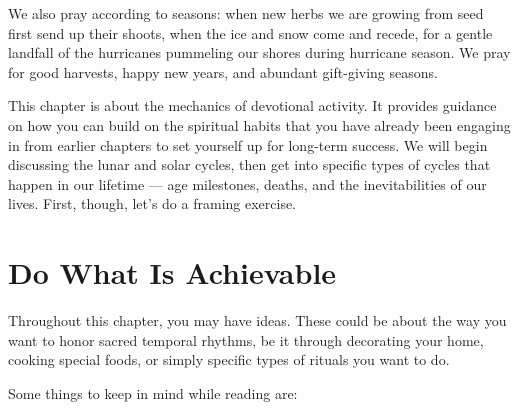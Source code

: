 \documentclass[
]{book}
\begin{document}
We also pray according to seasons: when new herbs we are growing from seed first send up their shoots, when the ice and snow come and recede, for a gentle landfall of the hurricanes pummeling our shores during hurricane season. We pray for good harvests, happy new years, and abundant gift-giving seasons.

This chapter is about the mechanics of devotional activity. It provides guidance on how you can build on the spiritual habits that you have already been engaging in from earlier chapters to set yourself up for long-term success. We will begin discussing the lunar and solar cycles, then get into specific types of cycles that happen in our lifetime --- age milestones, deaths, and the inevitabilities of our lives. First, though, let's do a framing exercise.

\hypertarget{do-what-is-achievable}{%
\section{Do What Is Achievable}\label{do-what-is-achievable}}

Throughout this chapter, you may have ideas. These could be about the way you want to honor sacred temporal rhythms, be it through decorating your home, cooking special foods, or simply specific types of rituals you want to do.

Some things to keep in mind while reading are:
\end{document}
